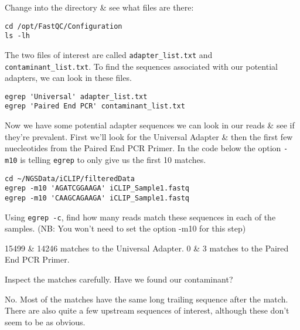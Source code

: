 \begin{steps}
Change into the directory \& see what files are there:
\begin{lstlisting}
cd /opt/FastQC/Configuration
ls -lh
\end{lstlisting}
\end{steps}

\begin{steps}
The two files of interest are called \texttt{adapter\_list.txt} and \texttt{contaminant\_list.txt}.
To find the sequences associated with our potential adapters, we can look in these files.
\begin{lstlisting}
egrep 'Universal' adapter_list.txt
egrep 'Paired End PCR' contaminant_list.txt
\end{lstlisting}
\end{steps}

\begin{steps}
Now we have some potential adapter sequences we can look in our reads \& see if they're prevalent.
First we'll look for the Universal Adapter \& then the first few nuecleotides from the Paired End PCR Primer.
In the code below the option \texttt{-m10} is telling \texttt{egrep} to only give us the first 10 matches.
\begin{lstlisting}
cd ~/NGSData/iCLIP/filteredData
egrep -m10 'AGATCGGAAGA' iCLIP_Sample1.fastq
egrep -m10 'CAAGCAGAAGA' iCLIP_Sample1.fastq
\end{lstlisting}
\end{steps}

\begin{questions}
Using \texttt{egrep -c}, find how many reads match these sequences in each of the samples.
(NB: You won't need to set the option -m10 for this step)\\
\begin{answer}
15499 \& 14246 matches to the Universal Adapter.
0 \& 3 matches to the Paired End PCR Primer.\\
\end{answer}

Inspect the matches carefully.
Have we found our contaminant? \\
\begin{answer}
No. 
Most of the matches have the same long trailing sequence after the match.
There are also quite a few upstream sequences of interest, although these don't seem to be as obvious.
\end{answer}
\end{questions}

